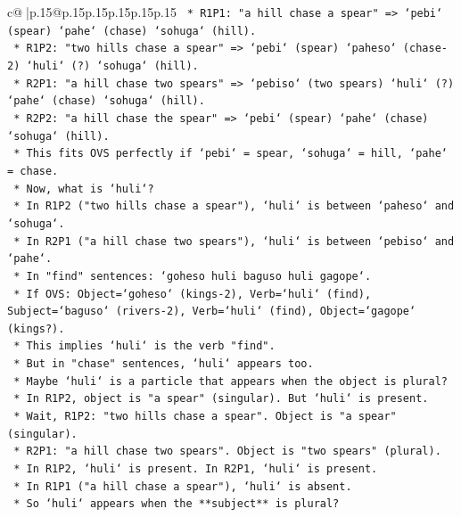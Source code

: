 \documentclass{article}
\begin{document}
{\begin{supertabular}{c@{$\;$}|p{.15\linewidth}@{}p{.15\linewidth}p{.15\linewidth}p{.15\linewidth}p{.15\linewidth}p{.15\linewidth}}
{{{\texttt{            *   R1P1: "a hill chase a spear" => `pebi` (spear) `pahe` (chase) `sohuga` (hill).} \\
\texttt{            *   R1P2: "two hills chase a spear" => `pebi` (spear) `paheso` (chase{-}2) `huli` (?) `sohuga` (hill).} \\
\texttt{            *   R2P1: "a hill chase two spears" => `pebiso` (two spears) `huli` (?) `pahe` (chase) `sohuga` (hill).} \\
\texttt{            *   R2P2: "a hill chase the spear" => `pebi` (spear) `pahe` (chase) `sohuga` (hill).} \\
\texttt{            *   This fits OVS perfectly if `pebi` = spear, `sohuga` = hill, `pahe` = chase.} \\
\texttt{            *   Now, what is `huli`?} \\
\texttt{            *   In R1P2 ("two hills chase a spear"), `huli` is between `paheso` and `sohuga`.} \\
\texttt{            *   In R2P1 ("a hill chase two spears"), `huli` is between `pebiso` and `pahe`.} \\
\texttt{            *   In "find" sentences: `goheso huli baguso huli gagope`.} \\
\texttt{                *   If OVS: Object=`goheso` (kings{-}2), Verb=`huli` (find), Subject=`baguso` (rivers{-}2), Verb=`huli` (find), Object=`gagope` (kings?).} \\
\texttt{                *   This implies `huli` is the verb "find".} \\
\texttt{                *   But in "chase" sentences, `huli` appears too.} \\
\texttt{                *   Maybe `huli` is a particle that appears when the object is plural?} \\
\texttt{                *   In R1P2, object is "a spear" (singular). But `huli` is present.} \\
\texttt{                *   Wait, R1P2: "two hills chase a spear". Object is "a spear" (singular).} \\
\texttt{                *   R2P1: "a hill chase two spears". Object is "two spears" (plural).} \\
\texttt{                *   In R1P2, `huli` is present. In R2P1, `huli` is present.} \\
\texttt{                *   In R1P1 ("a hill chase a spear"), `huli` is absent.} \\
\texttt{                *   So `huli` appears when the **subject** is plural?} \\
}}}
\end{supertabular}}
\end{document}
